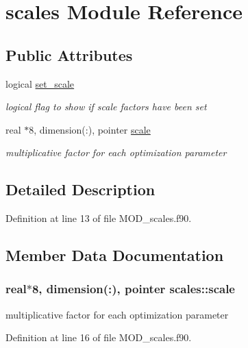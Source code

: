 \hypertarget{classscales}{\section{scales Module Reference}
\label{classscales}
}
\subsection*{Public Attributes}
\begin{DoxyCompactItemize}
\item 
logical \hyperlink{classscales_a15927af9fdc131ae21d41c8b9dd8d5e5}{set\-\_\-scale}
\begin{DoxyCompactList}\small\item\em logical flag to show if scale factors have been set \end{DoxyCompactList}\item 
real $\ast$8, dimension(\-:), pointer \hyperlink{classscales_a20e252bac3ecd421d6ab1e83d5d7e18b}{scale}
\begin{DoxyCompactList}\small\item\em multiplicative factor for each optimization parameter \end{DoxyCompactList}\end{DoxyCompactItemize}


\subsection{Detailed Description}


Definition at line 13 of file M\-O\-D\-\_\-scales.\-f90.



\subsection{Member Data Documentation}
\hypertarget{classscales_a20e252bac3ecd421d6ab1e83d5d7e18b}{
\subsubsection[{scale}]{\setlength{\rightskip}{0pt plus 5cm}real$\ast$8, dimension(\-:), pointer scales\-::scale}}\label{classscales_a20e252bac3ecd421d6ab1e83d5d7e18b}


multiplicative factor for each optimization parameter 



Definition at line 16 of file M\-O\-D\-\_\-scales.\-f90.

